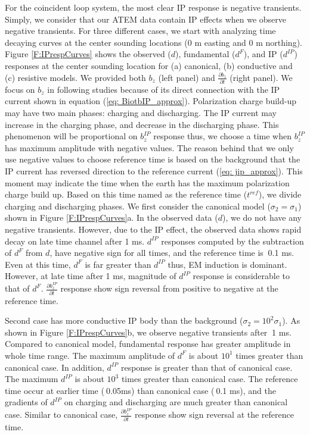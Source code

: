 \documentclass[a4paper, 11pt]{article}
\newcommand{\dip}{d^{IP}}
\begin{document}
For the coincident loop system, the most clear IP response is negative transients. Simply, we consider that our ATEM data contain IP effects when we observe negative transients. For three different cases, we start with analyzing time decaying curves at the center sounding locations (0 m easting and 0 m northing). Figure \ref{F:IPrespCurves} shows the observed ($d$), fundamental ($d^{F}$), and IP ($\dip$) responses at the center sounding location for (a) canonical, (b) conductive and (c) resistive models. We provided both $b_z$ (left panel) and $\frac{\partial b_z}{\partial t}$ (right panel). We focus on $b_z$ in following studies because of its direct connection with the IP current shown in equation (\ref{eq: BiotbIP_approx}). Polarization charge build-up may have two main phases: charging and discharging. The IP current may increase in the charging phase, and decrease in the discharging phase. This phenomenon will be proportional on $b^{IP}_z$ response thus, we choose a time when $b^{IP}_z$ has maximum amplitude with negative values. The reason behind that we only use negative values to choose reference time is based on the background that the IP current has reversed direction to the reference current (\ref{eq: jip_approx}). This moment may indicate the time when the earth has the maximum polarization charge build up. Based on this time named as the reference time ($t^{ref}$), we divide charging and discharging phases.  We first consider the canonical model ($\sigma_2 = \sigma_1$) shown in Figure \ref{F:IPrespCurves}a. In the observed data ($d$), we do not have any negative transients. However, due to the IP effect, the observed data shows rapid decay on late time channel after 1 ms. $\dip$ responses computed by the subtraction of $d^F$ from $d$, have negative sign for all times, and the reference time is $~$0.1 ms. Even at this time, $d^{F}$ is far greater than $\dip$ thus, EM induction is dominant. However, at late time after 1 ms, magnitude of $\dip$ response is considerable to that of $d^{F}$. $\frac{\partial b^{IP}_z}{\partial t}$ response show sign reversal from positive to negative at the reference time.

Second case has more conductive IP body than the background ($\sigma_2 = 10^{2}\sigma_1$). As shown in Figure \ref{F:IPrespCurves}b, we observe negative transients after $~$1 ms. Compared to canonical model, fundamental response has greater amplitude in whole time range. The maximum amplitude of $d^{F}$ is about $10^{1}$ times greater than canonical case.  In addition, $\dip$ response is greater than that of canonical case. The maximum $\dip$ is about $10^{3}$ times greater than canonical case.  The reference time occur at earlier time ($~$0.05ms) than canonical case ($~$0.1 ms), and the gradients of $\dip$ on charging and discharging are much greater than canonical case. Similar to canonical case, $\frac{\partial b^{IP}_z}{\partial t}$ response show sign reversal at the reference time. 
\end{document}
